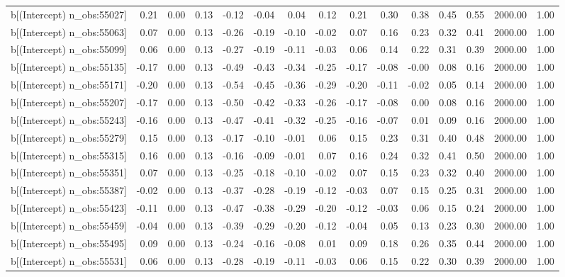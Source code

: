 \begin{table}[ht]
\begin{tabular}{rrrrrrrrrrrrrrr}
  b[(Intercept) n\_obs:55027] & 0.21 & 0.00 & 0.13 & -0.12 & -0.04 & 0.04 & 0.12 & 0.21 & 0.30 & 0.38 & 0.45 & 0.55 & 2000.00 & 1.00 \\ 
  b[(Intercept) n\_obs:55063] & 0.07 & 0.00 & 0.13 & -0.26 & -0.19 & -0.10 & -0.02 & 0.07 & 0.16 & 0.23 & 0.32 & 0.41 & 2000.00 & 1.00 \\ 
  b[(Intercept) n\_obs:55099] & 0.06 & 0.00 & 0.13 & -0.27 & -0.19 & -0.11 & -0.03 & 0.06 & 0.14 & 0.22 & 0.31 & 0.39 & 2000.00 & 1.00 \\ 
  b[(Intercept) n\_obs:55135] & -0.17 & 0.00 & 0.13 & -0.49 & -0.43 & -0.34 & -0.25 & -0.17 & -0.08 & -0.00 & 0.08 & 0.16 & 2000.00 & 1.00 \\ 
  b[(Intercept) n\_obs:55171] & -0.20 & 0.00 & 0.13 & -0.54 & -0.45 & -0.36 & -0.29 & -0.20 & -0.11 & -0.02 & 0.05 & 0.14 & 2000.00 & 1.00 \\ 
  b[(Intercept) n\_obs:55207] & -0.17 & 0.00 & 0.13 & -0.50 & -0.42 & -0.33 & -0.26 & -0.17 & -0.08 & 0.00 & 0.08 & 0.16 & 2000.00 & 1.00 \\ 
  b[(Intercept) n\_obs:55243] & -0.16 & 0.00 & 0.13 & -0.47 & -0.41 & -0.32 & -0.25 & -0.16 & -0.07 & 0.01 & 0.09 & 0.16 & 2000.00 & 1.00 \\ 
  b[(Intercept) n\_obs:55279] & 0.15 & 0.00 & 0.13 & -0.17 & -0.10 & -0.01 & 0.06 & 0.15 & 0.23 & 0.31 & 0.40 & 0.48 & 2000.00 & 1.00 \\ 
  b[(Intercept) n\_obs:55315] & 0.16 & 0.00 & 0.13 & -0.16 & -0.09 & -0.01 & 0.07 & 0.16 & 0.24 & 0.32 & 0.41 & 0.50 & 2000.00 & 1.00 \\ 
  b[(Intercept) n\_obs:55351] & 0.07 & 0.00 & 0.13 & -0.25 & -0.18 & -0.10 & -0.02 & 0.07 & 0.15 & 0.23 & 0.32 & 0.40 & 2000.00 & 1.00 \\ 
  b[(Intercept) n\_obs:55387] & -0.02 & 0.00 & 0.13 & -0.37 & -0.28 & -0.19 & -0.12 & -0.03 & 0.07 & 0.15 & 0.25 & 0.31 & 2000.00 & 1.00 \\ 
  b[(Intercept) n\_obs:55423] & -0.11 & 0.00 & 0.13 & -0.47 & -0.38 & -0.29 & -0.20 & -0.12 & -0.03 & 0.06 & 0.15 & 0.24 & 2000.00 & 1.00 \\ 
  b[(Intercept) n\_obs:55459] & -0.04 & 0.00 & 0.13 & -0.39 & -0.29 & -0.20 & -0.12 & -0.04 & 0.05 & 0.13 & 0.23 & 0.30 & 2000.00 & 1.00 \\ 
  b[(Intercept) n\_obs:55495] & 0.09 & 0.00 & 0.13 & -0.24 & -0.16 & -0.08 & 0.01 & 0.09 & 0.18 & 0.26 & 0.35 & 0.44 & 2000.00 & 1.00 \\ 
  b[(Intercept) n\_obs:55531] & 0.06 & 0.00 & 0.13 & -0.28 & -0.19 & -0.11 & -0.03 & 0.06 & 0.15 & 0.22 & 0.30 & 0.39 & 2000.00 & 1.00 \\ 

\end{tabular}
\end{table}
